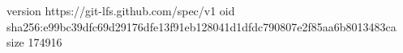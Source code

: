 version https://git-lfs.github.com/spec/v1
oid sha256:e99bc39dfc69d29176dfe13f91eb128041d1dfdc790807e2f85aa6b8013483ca
size 174916

